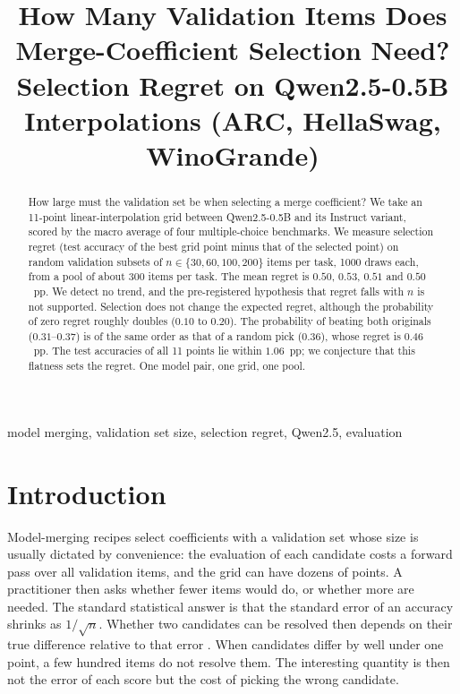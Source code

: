 \documentclass[conference]{IEEEtran}
\begin{document}
\title{How Many Validation Items Does Merge-Coefficient Selection Need? Selection Regret on Qwen2.5-0.5B Interpolations (ARC, HellaSwag, WinoGrande)}

\author{
}

\maketitle

\begin{abstract}
How large must the validation set be when selecting a merge coefficient? We take an 11-point linear-interpolation grid between Qwen2.5-0.5B and its Instruct variant, scored by the macro average of four multiple-choice benchmarks. We measure selection regret (test accuracy of the best grid point minus that of the selected point) on random validation subsets of $n\in\{30,60,100,200\}$ items per task, 1000 draws each, from a pool of about 300 items per task. The mean regret is $0.50$, $0.53$, $0.51$ and $0.50$~pp. We detect no trend, and the pre-registered hypothesis that regret falls with $n$ is not supported. Selection does not change the expected regret, although the probability of zero regret roughly doubles ($0.10$ to $0.20$). The probability of beating both originals ($0.31$--$0.37$) is of the same order as that of a random pick ($0.36$), whose regret is $0.46$~pp. The test accuracies of all 11 points lie within $1.06$~pp; we conjecture that this flatness sets the regret. One model pair, one grid, one pool.
\end{abstract}

\begin{IEEEkeywords}
model merging, validation set size, selection regret, Qwen2.5, evaluation
\end{IEEEkeywords}

\section{Introduction}
Model-merging recipes select coefficients with a validation set whose size is usually dictated by convenience: the evaluation of each candidate costs a forward pass over all validation items, and the grid can have dozens of points. A practitioner then asks whether fewer items would do, or whether more are needed. The standard statistical answer is that the standard error of an accuracy shrinks as $1/\sqrt{n}$. Whether two candidates can be resolved then depends on their true difference relative to that error \cite{miller2024errorbars}. When candidates differ by well under one point, a few hundred items do not resolve them. The interesting quantity is then not the error of each score but the cost of picking the wrong candidate.
\end{document}
